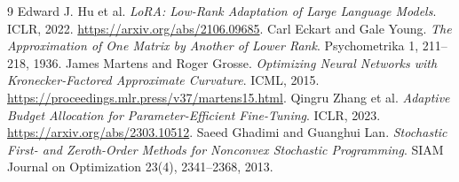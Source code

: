 \documentclass[11pt]{article}
\begin{document}
\begin{thebibliography}{9}
Edward J. Hu et al.
\emph{LoRA: Low-Rank Adaptation of Large Language Models}.
ICLR, 2022. \url{https://arxiv.org/abs/2106.09685}.
Carl Eckart and Gale Young.
\emph{The Approximation of One Matrix by Another of Lower Rank}.
Psychometrika 1, 211--218, 1936.
James Martens and Roger Grosse.
\emph{Optimizing Neural Networks with Kronecker-Factored Approximate Curvature}.
ICML, 2015. \url{https://proceedings.mlr.press/v37/martens15.html}.
Qingru Zhang et al.
\emph{Adaptive Budget Allocation for Parameter-Efficient Fine-Tuning}.
ICLR, 2023. \url{https://arxiv.org/abs/2303.10512}.
Saeed Ghadimi and Guanghui Lan.
\emph{Stochastic First- and Zeroth-Order Methods for Nonconvex Stochastic Programming}.
SIAM Journal on Optimization 23(4), 2341--2368, 2013.
\end{thebibliography}
\end{document}
